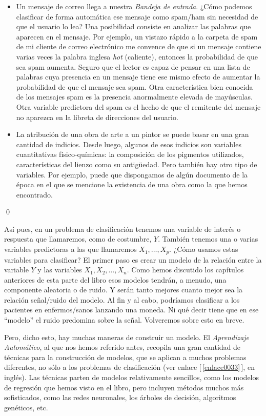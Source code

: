 \begin{ejemplo}
\begin{itemize}
\item Un mensaje de correo llega a nuestra {\em Bandeja de entrada}. ¿Cómo podemos clasificar de forma automática ese mensaje como spam/ham sin necesidad de que el usuario lo lea? Una posibilidad consiste en analizar las palabras que aparecen en el mensaje. Por ejemplo, un vistazo rápido a la carpeta de spam de mi cliente de correo electrónico me convence de que si un mensaje contiene varias veces la palabra inglesa {\em hot} (caliente), entonces la probabilidad de que sea spam aumenta. Seguro que el lector es capaz de pensar en una lista de palabras cuya presencia en un mensaje tiene ese mismo efecto de aumentar la probabilidad de que el mensaje sea spam.  Otra característica  bien conocida de los mensajes spam es la presencia anormalmente elevada de mayúsculas. Otra variable predictora  del spam es el hecho de que el remitente del mensaje no aparezca en la libreta de direcciones del usuario.

\item La atribución de una obra de arte a un pintor se puede basar en una gran cantidad de indicios. Desde luego, algunos de esos indicios son variables cuantitativas físico-químicas: la composición de  los pigmentos utilizados, características del lienzo como su antigüedad. Pero también hay otro tipo de variables. Por ejemplo, puede que dispongamos de algún documento de la época en el que se mencione la existencia de una obra como la que hemos encontrado.
	
\end{itemize}	
	
\qed
\end{ejemplo}

Así pues, en un problema de clasificación tenemos una variable de interés o respuesta que llamaremos, como de costumbre, $Y$.  También tenemos una o varias variables predictoras a las que llamaremos $X_1,\ldots, X_p$. ¿Cómo usamos estas variables para clasificar? El primer paso es crear un modelo de la relación entre la variable $Y$ y las variables $X_1, X_2,\ldots, X_n$. Como hemos discutido los capítulos anteriores de esta parte del libro esos modelos tendrán, a menudo, una componente aleatoria o de ruido. Y serán tanto mejores cuanto mejor sea la relación señal/ruido del modelo.  Al fin y al cabo, podríamos clasificar  a los pacientes en enfermos/sanos lanzando una moneda. Ni qué decir tiene que en ese ``modelo'' el ruido predomina sobre la señal. Volveremos sobre esto en breve.

Pero, dicho esto, hay muchas maneras de construir un modelo. El {\em Aprendizaje Automático}, al que nos hemos referido antes, recopila una gran cantidad de técnicas para la construcción de modelos, que se aplican a muchos problemas diferentes, no sólo a los problemas de clasificación (ver enlace [\,\ref{enlace0033}\,]\label{enlace0033a}, en inglés).  Las técnicas parten de modelos relativamente sencillos, como los modelos de regresión que hemos visto en el libro, pero incluyen métodos muchos más sofisticados, como las redes neuronales, los árboles de decisión, algoritmos genéticos, etc.


